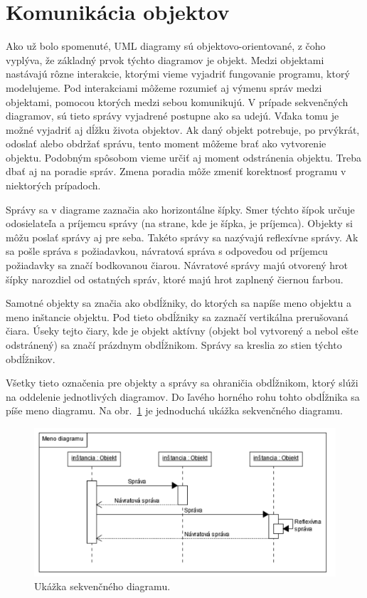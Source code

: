 \documentclass[10pt,slovak,a4paper]{article}
\begin{document}
\section{Komunikácia objektov}

Ako už bolo spomenuté, UML diagramy sú objektovo-orientované, z čoho vyplýva, že základný prvok týchto diagramov je objekt. 
Medzi objektami nastávajú rôzne interakcie, ktorými vieme vyjadriť fungovanie programu, ktorý modelujeme. 
Pod interakciami môžeme rozumieť aj výmenu správ medzi objektami, pomocou ktorých medzi sebou komunikujú.
V prípade sekvenčných diagramov, sú tieto správy vyjadrené postupne ako sa udejú. Vďaka tomu je možné vyjadriť aj dĺžku života objektov. 
Ak daný objekt potrebuje, po prvýkrát, odoslať alebo obdržať správu, tento moment môžeme brať ako vytvorenie objektu. Podobným spôsobom vieme určiť aj moment odstránenia objektu.   
Treba dbať aj na poradie správ. Zmena poradia môže zmeniť korektnosť programu v niektorých prípadoch. \cite{petraq14} \newline

\noindent Správy sa v diagrame zaznačia ako horizontálne šípky. Smer týchto šípok určuje odosielateľa a
príjemcu správy (na strane, kde je šípka, je príjemca). Objekty si môžu poslať správy aj pre seba. Takéto správy sa nazývajú reflexívne správy. \cite{petraq14} 
Ak sa pošle správa s požiadavkou, návratová správa s odpoveďou od príjemcu požiadavky sa značí bodkovanou čiarou. 
Návratové správy majú otvorený hrot šípky narozdiel od ostatných správ, ktoré majú hrot zaplnený čiernou farbou. \cite{booch00}\newline

\noindent Samotné objekty sa značia ako obdĺžniky, do ktorých sa napíše meno objektu a meno inštancie objektu. Pod tieto obdĺžniky sa zaznačí vertikálna prerušovaná čiara. 
Úseky tejto čiary, kde je objekt aktívny (objekt bol vytvorený a nebol ešte odstránený) sa značí prázdnym obdĺžnikom. Správy sa kreslia zo stien týchto obdĺžnikov. \cite{booch00} \newline

\noindent Všetky tieto označenia pre objekty a správy sa ohraničia obdĺžnikom, ktorý slúži na oddelenie jednotlivých diagramov.
Do ľavého horného rohu tohto obdĺžnika sa píše meno diagramu. \cite{booch00}
Na obr.~\ref{diag1} je jednoduchá ukážka sekvenčného diagramu.

\begin{figure}[tbh]
\centering
\includegraphics[scale=0.8]{simple_diag.pdf}
\caption{Ukážka sekvenčného diagramu.\cite{booch00}}
\label{diag1}
\end{figure}
\end{document}
